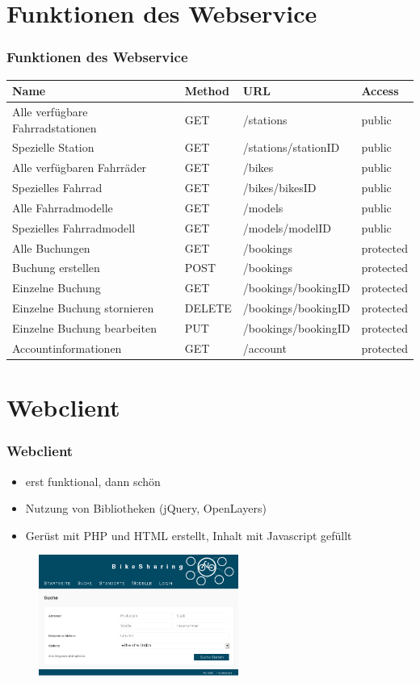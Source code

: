 \section{Funktionen des Webservice}
\begin{frame}
	\frametitle*{Funktionen des Webservice}
		\begin{tabularx}{\columnwidth}{|X|p{1cm}|p{2.5cm}|p{1.5cm}|}
		\hline
		Name & Method & URL & Access \\
		\hline
		\hline
		Alle verfügbare Fahrradstationen & GET & /stations & public \\
		\hline
		Spezielle Station & GET & /stations/stationID & public \\
		\hline
		Alle verfügbaren Fahrräder & GET & /bikes & public \\
		\hline
		Spezielles Fahrrad & GET & /bikes/bikesID & public \\
		\hline
		Alle Fahrradmodelle & GET & /models & public \\
		\hline
		Spezielles Fahrradmodell & GET & /models/modelID & public \\
		\hline
		Alle Buchungen & GET & /bookings & protected \\
		\hline
		Buchung erstellen & POST & /bookings & protected \\
		\hline
		Einzelne Buchung & GET & /bookings/bookingID & protected \\
		\hline
		Einzelne Buchung stornieren & DELETE & /bookings/bookingID & protected \\
		\hline
		Einzelne Buchung bearbeiten & PUT & /bookings/bookingID & protected \\
		\hline
		Accountinformationen & GET & /account & protected \\
		\hline
	\end{tabularx}
\end{frame}

\section{Webclient}
\begin{frame}
	\frametitle*{Webclient}
	\begin{itemize}
		\item erst funktional, dann schön
		\item Nutzung von Bibliotheken (jQuery, OpenLayers)
		\item Gerüst mit PHP und HTML erstellt, Inhalt mit Javascript gefüllt
	\end{itemize}
	\begin{figure}
		\centering
		\includegraphics[height=40mm]{pics/bikesharing_search.png}
	\end{figure}
\end{frame}

